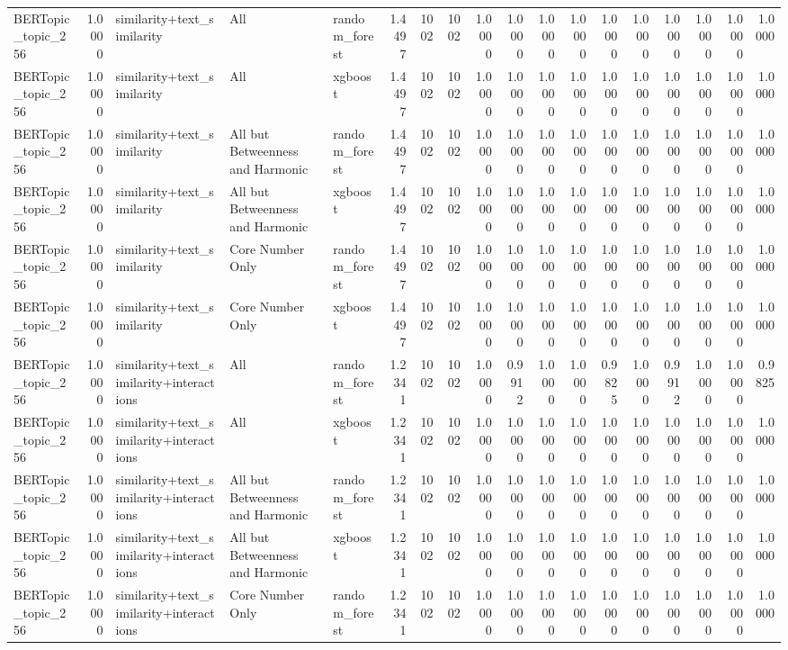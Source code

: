 \begin{tabular}{lrlllrrrrrrrrrrrrr}
BERTopic_topic_256 & 1.0000 & similarity+text_similarity & All & random_forest & 1.4497 & 1002 & 1002 & 1.0000 & 1.0000 & 1.0000 & 1.0000 & 1.0000 & 1.0000 & 1.0000 & 1.0000 & 1.0000 & 1.0000 \\
BERTopic_topic_256 & 1.0000 & similarity+text_similarity & All & xgboost & 1.4497 & 1002 & 1002 & 1.0000 & 1.0000 & 1.0000 & 1.0000 & 1.0000 & 1.0000 & 1.0000 & 1.0000 & 1.0000 & 1.0000 \\
BERTopic_topic_256 & 1.0000 & similarity+text_similarity & All but Betweenness and Harmonic & random_forest & 1.4497 & 1002 & 1002 & 1.0000 & 1.0000 & 1.0000 & 1.0000 & 1.0000 & 1.0000 & 1.0000 & 1.0000 & 1.0000 & 1.0000 \\
BERTopic_topic_256 & 1.0000 & similarity+text_similarity & All but Betweenness and Harmonic & xgboost & 1.4497 & 1002 & 1002 & 1.0000 & 1.0000 & 1.0000 & 1.0000 & 1.0000 & 1.0000 & 1.0000 & 1.0000 & 1.0000 & 1.0000 \\
BERTopic_topic_256 & 1.0000 & similarity+text_similarity & Core Number Only & random_forest & 1.4497 & 1002 & 1002 & 1.0000 & 1.0000 & 1.0000 & 1.0000 & 1.0000 & 1.0000 & 1.0000 & 1.0000 & 1.0000 & 1.0000 \\
BERTopic_topic_256 & 1.0000 & similarity+text_similarity & Core Number Only & xgboost & 1.4497 & 1002 & 1002 & 1.0000 & 1.0000 & 1.0000 & 1.0000 & 1.0000 & 1.0000 & 1.0000 & 1.0000 & 1.0000 & 1.0000 \\
BERTopic_topic_256 & 1.0000 & similarity+text_similarity+interactions & All & random_forest & 1.2341 & 1002 & 1002 & 1.0000 & 0.9912 & 1.0000 & 1.0000 & 0.9825 & 1.0000 & 0.9912 & 1.0000 & 1.0000 & 0.9825 \\
BERTopic_topic_256 & 1.0000 & similarity+text_similarity+interactions & All & xgboost & 1.2341 & 1002 & 1002 & 1.0000 & 1.0000 & 1.0000 & 1.0000 & 1.0000 & 1.0000 & 1.0000 & 1.0000 & 1.0000 & 1.0000 \\
BERTopic_topic_256 & 1.0000 & similarity+text_similarity+interactions & All but Betweenness and Harmonic & random_forest & 1.2341 & 1002 & 1002 & 1.0000 & 1.0000 & 1.0000 & 1.0000 & 1.0000 & 1.0000 & 1.0000 & 1.0000 & 1.0000 & 1.0000 \\
BERTopic_topic_256 & 1.0000 & similarity+text_similarity+interactions & All but Betweenness and Harmonic & xgboost & 1.2341 & 1002 & 1002 & 1.0000 & 1.0000 & 1.0000 & 1.0000 & 1.0000 & 1.0000 & 1.0000 & 1.0000 & 1.0000 & 1.0000 \\
BERTopic_topic_256 & 1.0000 & similarity+text_similarity+interactions & Core Number Only & random_forest & 1.2341 & 1002 & 1002 & 1.0000 & 1.0000 & 1.0000 & 1.0000 & 1.0000 & 1.0000 & 1.0000 & 1.0000 & 1.0000 & 1.0000 \\

\end{tabular}
